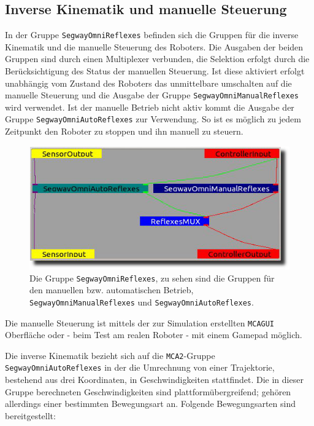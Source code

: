 \subsection{Inverse Kinematik und manuelle Steuerung}
\label{inverse_kinematik_subsec}
\authorsection{\editorjulian}

In der Gruppe \lstinline{SegwayOmniReflexes} befinden sich die Gruppen für die inverse Kinematik und die manuelle Steuerung des Roboters. Die Ausgaben der beiden Gruppen sind durch einen Multiplexer verbunden, die Selektion erfolgt durch die Berücksichtigung des Status der manuellen Steuerung. Ist diese aktiviert erfolgt unabhängig vom Zustand des Roboters das unmittelbare umschalten auf die manuelle Steuerung und die Ausgabe der Gruppe \lstinline{SegwayOmniManualReflexes} wird verwendet. Ist der manuelle Betrieb nicht aktiv kommt die Ausgabe der Gruppe \lstinline{SegwayOmniAutoReflexes} zur Verwendung. So ist es möglich zu jedem Zeitpunkt den Roboter zu stoppen und ihn manuell zu steuern.

\begin{figure}[h]
	\label{fig:bahnplanung_reflexes_gruppe}
	\center
	\includegraphics[scale=0.7]{graphics/BILD-SegwayOmniReflexes.png}
	\caption{Die Gruppe \lstinline{SegwayOmniReflexes}, zu sehen sind die Gruppen für den manuellen bzw. automatischen Betrieb, \lstinline{SegwayOmniManualReflexes} und \lstinline{SegwayOmniAutoReflexes}.}
\end{figure}

Die manuelle Steuerung ist mittels der zur Simulation erstellten \lstinline{MCAGUI} Oberfläche oder - beim Test am realen Roboter - mit einem Gamepad möglich.

Die inverse Kinematik bezieht sich auf die \lstinline{MCA2}-Gruppe \lstinline{SegwayOmniAutoReflexes} in der die Umrechnung von einer Trajektorie, bestehend aus drei Koordinaten, in Geschwindigkeiten stattfindet. Die in dieser Gruppe berechneten Geschwindigkeiten sind plattformübergreifend; gehören allerdings einer bestimmten Bewegungsart an. Folgende Bewegungsarten sind bereitgestellt:

